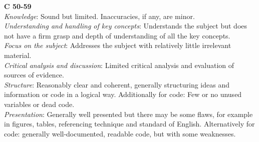 \documentclass[11pt,]{article}
\begin{document}
{\bf C 50-59} \\
\emph{Knowledge}: Sound but limited. Inaccuracies, if any, are minor.\\
\emph{Understanding and handling of key concepts}: Understands the subject but does not have a firm grasp and depth of understanding of all the key concepts.\\
\emph{Focus on the subject}: Addresses the subject with relatively little irrelevant material.\\
\emph{Critical analysis and discussion}: Limited critical analysis and evaluation of sources of evidence.\\
\emph{Structure}: Reasonably clear and coherent, generally structuring ideas and information or code in a logical way. Additionally for code: Few or no unused variables or dead code.\\
\emph{Presentation}: Generally well presented but there may be some flaws, for example in figures, tables, referencing technique and standard of English. Alternatively for code: generally well-documented, readable code, but with some weaknesses.\\






\end{document}
